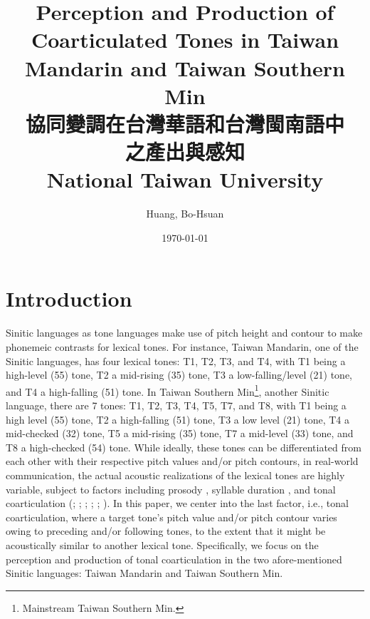 \documentclass[12pt]{report}
\title{
{Perception and Production of Coarticulated Tones in Taiwan Mandarin and Taiwan Southern Min\\協同變調在台灣華語和台灣閩南語中\\之產出與感知}\\
{\large National Taiwan University}
}
\author{Huang, Bo-Hsuan}
\date{\today}
\begin{document}
\large
\noautomath
\begin{CJK}{UTF8}{bsmi}

\begin{titlepage}
   \begin{center}
       \vspace*{1cm}
		\sloppy
		\let\newpage\relax\maketitle
   \end{center}
\end{titlepage}

\tableofcontents

\pagebreak
\chapter{Introduction}\label{chapter:Introduction}

Sinitic languages as tone languages make use of pitch height and contour to make phonemeic contrasts for lexical tones. For instance, Taiwan Mandarin, one of the Sinitic languages, has four lexical tones: T1, T2, T3, and T4, with T1 being a high-level (55) tone, T2 a mid-rising (35) tone, T3 a low-falling/level (21) tone, and T4 a high-falling (51) tone. In Taiwan Southern Min\footnote{Mainstream Taiwan Southern Min.}, another Sinitic language, there are 7 tones: T1, T2, T3, T4, T5, T7, and T8, with T1 being a high level (55) tone, T2 a high-falling (51) tone, T3 a low level (21) tone, T4 a mid-checked (32) tone, T5 a mid-rising (35) tone, T7 a mid-level (33) tone, and T8 a high-checked (54) tone. While ideally, these tones can be differentiated from each other with their respective pitch values and/or pitch contours, in real-world communication, the actual acoustic realizations of the lexical tones are highly variable, subject to factors including prosody \citep{Peng1997}, syllable duration \citep{XuWang2009}, and tonal coarticulation (\citealp{Shen1990}; \citealp{Xu1994}; \citealp{Peng1997}; \citeyear{Xu1997}; \citealp{Wang2002}; \citealp{ChangHsieh2012}). In this paper, we center into the last factor, i.e., tonal coarticulation, where a target tone's pitch value and/or pitch contour varies owing to preceding and/or following tones, to the extent that it might be acoustically similar to another lexical tone. Specifically, we focus on the perception and production of tonal coarticulation in the two afore-mentioned Sinitic languages: Taiwan Mandarin and Taiwan Southern Min.


\end{CJK}
\end{document}
